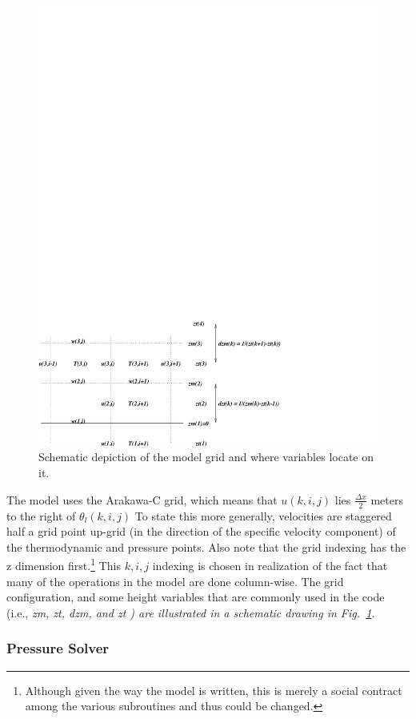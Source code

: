 \documentclass[11pt,a4paper]{article}
\begin{document}
\begin{figure}
\centering \leavevmode \includegraphics[width=12cm]{grid}
\caption{Schematic depiction of the model grid and where variables
locate on it.}
\label{fig:grid}
\end{figure}

The model uses the Arakawa-C grid, which means that $u(k,i,j)$ lies
$\frac{\Delta x}{2} $ meters to the right of $\theta_l(k,i,j)$ To
state this more generally, velocities are staggered half a grid point
up-grid (in the direction of the specific velocity component) of the
thermodynamic and pressure points.  Also note that the grid indexing
has the z dimension first.\footnote{Although given the way the model
is written, this is merely a social contract among the various
subroutines and thus could be changed.}  This $k,i,j$ indexing is
chosen in realization of the fact that many of the operations in the
model are done column-wise.  The grid configuration, and some height
variables that are commonly used in the code (i.e., \it zm, zt, dzm,
\rm and \it zt \rm) are illustrated in a schematic drawing in
Fig.~\ref{fig:grid}.

\subsubsection{Pressure Solver}
\end{document}
